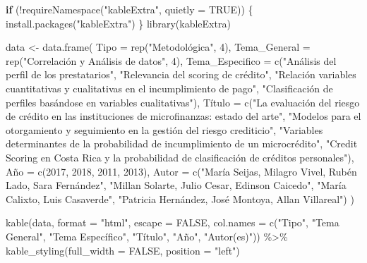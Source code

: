 \documentclass[
  letterpaper,
  DIV=11,
  numbers=noendperiod]{scrreprt}
\newenvironment{Shaded}{\begin{snugshade}}{\end{snugshade}}
\newcommand{\AttributeTok}[1]{\textcolor[rgb]{0.40,0.45,0.13}{#1}}
\newcommand{\ConstantTok}[1]{\textcolor[rgb]{0.56,0.35,0.01}{#1}}
\newcommand{\ControlFlowTok}[1]{\textcolor[rgb]{0.00,0.23,0.31}{\textbf{#1}}}
\newcommand{\DecValTok}[1]{\textcolor[rgb]{0.68,0.00,0.00}{#1}}
\newcommand{\FunctionTok}[1]{\textcolor[rgb]{0.28,0.35,0.67}{#1}}
\newcommand{\NormalTok}[1]{\textcolor[rgb]{0.00,0.23,0.31}{#1}}
\newcommand{\OtherTok}[1]{\textcolor[rgb]{0.00,0.23,0.31}{#1}}
\newcommand{\SpecialCharTok}[1]{\textcolor[rgb]{0.37,0.37,0.37}{#1}}
\newcommand{\StringTok}[1]{\textcolor[rgb]{0.13,0.47,0.30}{#1}}
\begin{document}
\begin{Shaded}
\begin{Highlighting}[]
\ControlFlowTok{if}\NormalTok{ (}\SpecialCharTok{!}\FunctionTok{requireNamespace}\NormalTok{(}\StringTok{"kableExtra"}\NormalTok{, }\AttributeTok{quietly =} \ConstantTok{TRUE}\NormalTok{)) \{}
  \FunctionTok{install.packages}\NormalTok{(}\StringTok{"kableExtra"}\NormalTok{)}
\NormalTok{\}}
\FunctionTok{library}\NormalTok{(kableExtra)}

\NormalTok{data }\OtherTok{\textless{}{-}} \FunctionTok{data.frame}\NormalTok{(}
  \AttributeTok{Tipo =} \FunctionTok{rep}\NormalTok{(}\StringTok{"Metodológica"}\NormalTok{, }\DecValTok{4}\NormalTok{),}
  \AttributeTok{Tema\_General =} \FunctionTok{rep}\NormalTok{(}\StringTok{"Correlación y Análisis de datos"}\NormalTok{, }\DecValTok{4}\NormalTok{),}
  \AttributeTok{Tema\_Especifico =} \FunctionTok{c}\NormalTok{(}\StringTok{"Análisis del perfil de los prestatarios"}\NormalTok{, }
                      \StringTok{"Relevancia del scoring de crédito"}\NormalTok{, }
                      \StringTok{"Relación variables cuantitativas y cualitativas en el incumplimiento de pago"}\NormalTok{, }
                      \StringTok{"Clasificación de perfiles basándose en variables cualitativas"}\NormalTok{),}
\NormalTok{  Título }\OtherTok{=} \FunctionTok{c}\NormalTok{(}\StringTok{"La evaluación del riesgo de crédito en las instituciones de microfinanzas: estado del arte"}\NormalTok{, }
             \StringTok{"Modelos para el otorgamiento y seguimiento en la gestión del riesgo crediticio"}\NormalTok{, }
             \StringTok{"Variables determinantes de la probabilidad de incumplimiento de un microcrédito"}\NormalTok{, }
             \StringTok{"Credit Scoring en Costa Rica y la probabilidad de clasificación de créditos personales"}\NormalTok{),}
\NormalTok{  Año }\OtherTok{=} \FunctionTok{c}\NormalTok{(}\DecValTok{2017}\NormalTok{, }\DecValTok{2018}\NormalTok{, }\DecValTok{2011}\NormalTok{, }\DecValTok{2013}\NormalTok{),}
  \AttributeTok{Autor =} \FunctionTok{c}\NormalTok{(}\StringTok{"María Seijas, Milagro Vivel, Rubén Lado, Sara Fernández"}\NormalTok{,}
            \StringTok{"Millan Solarte, Julio Cesar, Edinson Caicedo"}\NormalTok{,}
            \StringTok{"María Calixto, Luis Casaverde"}\NormalTok{,}
            \StringTok{"Patricia Hernández, José Montoya, Allan Villareal"}\NormalTok{)}
\NormalTok{)}


\FunctionTok{kable}\NormalTok{(data, }\AttributeTok{format =} \StringTok{"html"}\NormalTok{, }\AttributeTok{escape =} \ConstantTok{FALSE}\NormalTok{, }
      \AttributeTok{col.names =} \FunctionTok{c}\NormalTok{(}\StringTok{"Tipo"}\NormalTok{, }\StringTok{"Tema General"}\NormalTok{, }\StringTok{"Tema Específico"}\NormalTok{, }\StringTok{"Título"}\NormalTok{, }\StringTok{"Año"}\NormalTok{, }\StringTok{"Autor(es)"}\NormalTok{)) }\SpecialCharTok{\%\textgreater{}\%}
  \FunctionTok{kable\_styling}\NormalTok{(}\AttributeTok{full\_width =} \ConstantTok{FALSE}\NormalTok{, }\AttributeTok{position =} \StringTok{"left"}\NormalTok{) }
\end{Highlighting}
\end{Shaded}
\end{document}

